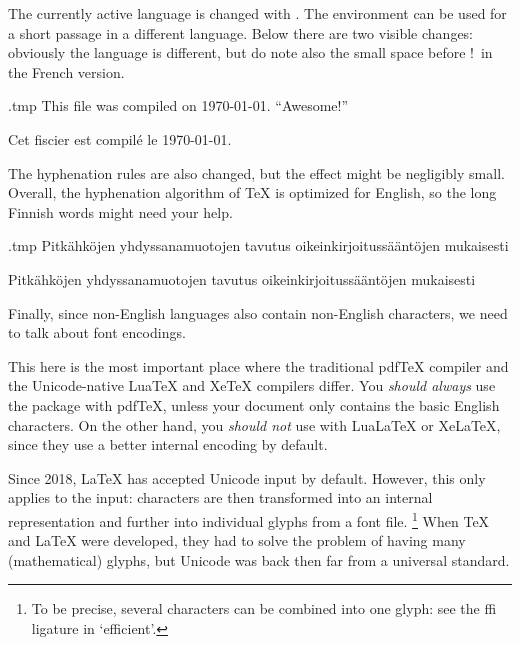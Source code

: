 The currently active language is changed with .
The  environment can be used for a short passage in a different language.
Below there are two visible changes:
obviously the language is different, but do note also the small space before !\ in the French version.
\begin{VerbatimOut}{\jobname.tmp}
This file was compiled on \today.
``Awesome!''\\

\begin{otherlanguage}{french}
Cet fiscier est compilé le \today.
\end{otherlanguage}
\end{VerbatimOut}
\ShowExample

The hyphenation rules are also changed,
but the effect might be negligibly small.
Overall, the hyphenation algorithm of \TeX{} is optimized for English,
so the long Finnish words might need your help.
\begin{VerbatimOut}{\jobname.tmp}
Pitkähköjen yhdyssanamuotojen tavutus
oikeinkirjoitussääntöjen mukaisesti\\

\begin{otherlanguage}{finnish}
Pitkähköjen yhdyssanamuotojen tavutus
oikeinkirjoitussääntöjen mukaisesti
\end{otherlanguage}
\end{VerbatimOut}
\ShowExample

Finally, since non-English languages also contain non-English characters,
we need to talk about font encodings.

\begin{gotcha}\label{rem:font encoding}
This here is the most important place where the traditional pdfTeX compiler
and the Unicode-native LuaTeX and XeTeX compilers differ.
You \emph{should always} use the  package with pdfTeX,
unless your document only contains the basic English characters.
On the other hand, you \emph{should not} use  with LuaLaTeX or XeLaTeX,
since they use a better internal encoding by default.
\end{gotcha}

Since 2018, \LaTeX{} has accepted Unicode input by default.
However, this only applies to the input:
characters are then transformed into an internal representation
and further into individual glyphs from a font file.%
\footnote{To be precise, several characters can be combined into one glyph:
see the ffi ligature in `efficient'.}
When \TeX{} and \LaTeX{} were developed,
they had to solve the problem of having many (mathematical) glyphs,
but Unicode was back then far from a universal standard.

